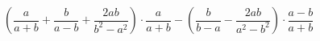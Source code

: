 \begin{ex}[type=expression]
	\begin{condition}
		\(\left( \dfrac{a}{a+b}+\dfrac{b}{a-b}+\dfrac{2ab}{b^2-a^2} \right)\cdot\dfrac{a}{a+b}-\left( \dfrac{b}{b-a}-\dfrac{2ab}{a^2-b^2} \right)\cdot\dfrac{a-b}{a+b}\)
	\end{condition}
\end{ex}